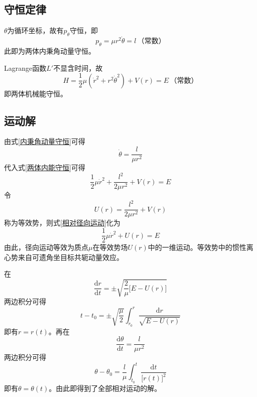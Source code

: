 \subsection{守恒定律}

$\theta$为循环坐标，故有$p_\theta$守恒，即
\begin{equation}
	p_\theta = \mu r^2 \dot{\theta} = l\,\text{（常数）}
	\label{内秉角动量守恒}
\end{equation}
此即为两体内秉角动量守恒。

Lagrange函数$L'$不显含时间，故
\begin{equation}
	H = \frac12 \mu \left(\dot{r}^2+r^2\dot{\theta}^2\right) + V(r) = E\,\text{（常数）}
	\label{两体内能守恒}
\end{equation}
即两体机械能守恒。

\subsection{运动解}

由式\eqref{内秉角动量守恒}可得
\begin{equation*}
	\dot{\theta} = \frac{l}{\mu r^2}
\end{equation*}
代入式\eqref{两体内能守恒}可得
\begin{equation}
	\frac12 \mu \dot{r}^2 + \frac{l^2}{2\mu r^2} + V(r) = E
	\label{相对径向运动}
\end{equation}
令
\begin{equation}
	U(r) = \frac{l^2}{2\mu r^2} + V(r)
\end{equation}
称为{\heiti 等效势}，则式\eqref{相对径向运动}化为
\begin{equation}
	\frac12 \mu \dot{r}^2 + U(r) = E
	\label{两体运动等效为一维运动}
\end{equation}
由此，径向运动等效为质点$\mu$在等效势场$U(r)$中的一维运动。等效势中的惯性离心势来自可遗角坐目标共轭动量效应。

在
\begin{equation}
	\frac{\mathrm{d} r}{\mathrm{d} t} = \pm \sqrt{\frac{2}{\mu}\big[E-U(r)\big]}
	\label{r对t的方程}
\end{equation}
两边积分可得
\begin{equation}
	t-t_0 = \pm \sqrt{\frac{\mu}{2}} \int_{r_0}^r \frac{\mathrm{d} r}{\sqrt{E-U(r)}}
	\label{t与r的关系}
\end{equation}
即有$r = r(t)$。再在
\begin{equation}
	\frac{\mathrm{d} \theta}{\mathrm{d} t} = \frac{l}{\mu r^2}
	\label{theta对t的方程}
\end{equation}
两边积分可得
\begin{equation}
	\theta - \theta_0 = \frac{l}{\mu} \int_{t_0}^t \frac{\mathrm{d} t}{\big[r(t)\big]^2}
	\label{chp4:theta与t的关系}
\end{equation}
即有$\theta = \theta(t)$。由此即得到了全部相对运动的解。

